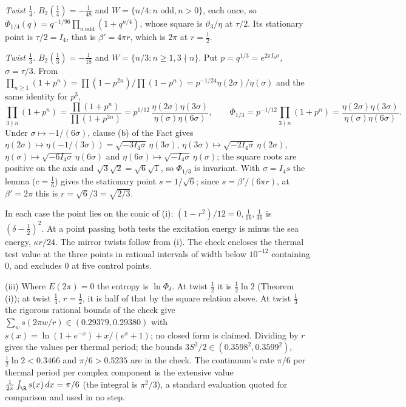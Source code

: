\emph{Twist $\tfrac14$.} $B_{2}(\tfrac14) = -\tfrac{1}{48}$ and $W = \{n/4 : n \text{ odd}, n > 0\}$, each once, so $\Phi_{1/4}(q) = q^{-1/96}\prod_{n\ \mathrm{odd}}(1 + q^{n/4})$, whose square is $\vartheta_{3}/\eta$ at $\tau/2$. Its stationary point is $\tau/2 = I_{4}$, that is $\beta' = 4\pi r$, which is $2\pi$ at $r = \tfrac12$.

\emph{Twist $\tfrac13$.} $B_{2}(\tfrac13) = -\tfrac{1}{18}$ and $W = \{n/3 : n \ge 1, 3 \nmid n\}$. Put $p = q^{1/3} = e^{2\pi I_{4}\sigma}$, $\sigma = \tau/3$. From $\prod_{n \ge 1}(1 + p^{n}) = \prod(1 - p^{2n})/\prod(1 - p^{n}) = p^{-1/24}\eta(2\sigma)/\eta(\sigma)$ and the same identity for $p^{3}$,
\[
\prod_{3 \nmid n}(1 + p^{n}) = \frac{\prod(1 + p^{n})}{\prod(1 + p^{3n})} = p^{1/12}\,\frac{\eta(2\sigma)\eta(3\sigma)}{\eta(\sigma)\eta(6\sigma)}, \qquad \Phi_{1/3} = p^{-1/12}\prod_{3 \nmid n}(1 + p^{n}) = \frac{\eta(2\sigma)\eta(3\sigma)}{\eta(\sigma)\eta(6\sigma)}.
\]
Under $\sigma \mapsto -1/(6\sigma)$, clause (b) of the Fact gives $\eta(2\sigma) \mapsto \eta(-1/(3\sigma)) = \sqrt{-3I_{4}\sigma}\,\eta(3\sigma)$, $\eta(3\sigma) \mapsto \sqrt{-2I_{4}\sigma}\,\eta(2\sigma)$, $\eta(\sigma) \mapsto \sqrt{-6I_{4}\sigma}\,\eta(6\sigma)$ and $\eta(6\sigma) \mapsto \sqrt{-I_{4}\sigma}\,\eta(\sigma)$; the square roots are positive on the axis and $\sqrt{3}\sqrt{2} = \sqrt{6}\sqrt{1}$, so $\Phi_{1/3}$ is invariant. With $\sigma = I_{4}s$ the lemma ($c = \tfrac16$) gives the stationary point $s = 1/\sqrt{6}$; since $s = \beta'/(6\pi r)$, at $\beta' = 2\pi$ this is $r = \sqrt{6}/3 = \sqrt{2/3}$.

In each case the point lies on the conic of (i): $(1 - r^{2})/12 = 0, \tfrac{1}{16}, \tfrac{1}{36}$ is $(\delta - \tfrac12)^{2}$. At a point passing both tests the excitation energy is minus the sea energy, $\kappa r/24$. The mirror twists follow from (i). The check encloses the thermal test value at the three points in rational intervals of width below $10^{-12}$ containing $0$, and excludes $0$ at five control points.

(iii) Where $E(2\pi) = 0$ the entropy is $\ln\Phi_{\delta}$. At twist $\tfrac12$ it is $\tfrac12\ln 2$ (Theorem (i)); at twist $\tfrac14$, $r = \tfrac12$, it is half of that by the square relation above. At twist $\tfrac13$ the rigorous rational bounds of the check give $\sum_{w}s(2\pi w/r) \in (0.29379, 0.29380)$ with $s(x) = \ln(1 + e^{-x}) + x/(e^{x} + 1)$; no closed form is claimed. Dividing by $r$ gives the values per thermal period; the bounds $3S^{2}/2 \in (0.3598^{2}, 0.3599^{2})$, $\tfrac12\ln 2 < 0.3466$ and $\pi/6 > 0.5235$ are in the check. The continuum's rate $\pi/6$ per thermal period per complex component is the extensive value $\tfrac{1}{2\pi}\int_{\R}s(x)\,dx = \pi/6$ (the integral is $\pi^{2}/3$), a standard evaluation quoted for comparison and used in no step.

